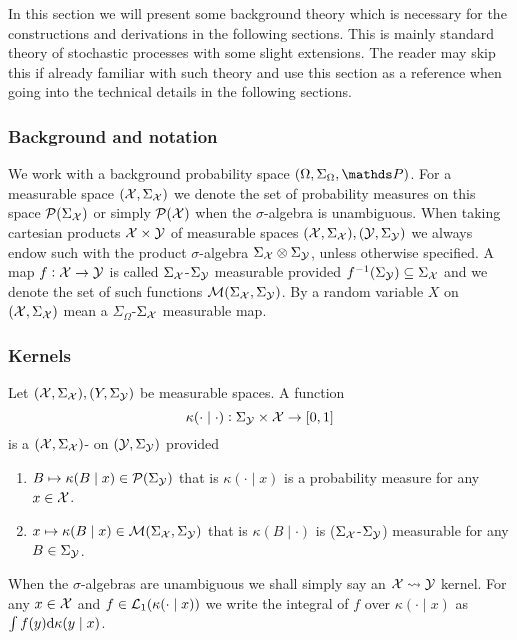 
In this section we will present some background theory which is
necessary for the constructions and derivations in the following
sections.
This is mainly standard theory of stochastic processes with some
slight extensions.
The reader may skip this if already familiar with such theory
and use this section as a reference when going into the technical
details in the following sections.

\subsubsection{Background and notation}

We work with a background probability space $(\Omega, \Sigma_\Omega, \Prob)$.
For a measurable space $(\mathcal{X}, \Sigma_{\mathcal{X}})$ we denote
the set of probability measures on this space $\mathcal{P}(\Sigma_\mathcal{X})$ or
simply $\mathcal{P}(\mathcal{X})$ when the $\sigma$-algebra is unambiguous.
When taking cartesian products $\mathcal{X} \times \mathcal{Y}$ of measurable spaces
$(\mathcal{X}, \Sigma_\mathcal{X}), (\mathcal{Y}, \Sigma_\mathcal{Y})$ we always endow such
with the product $\sigma$-algebra $\Sigma_\mathcal{X} \otimes \Sigma_\mathcal{Y}$,
unless otherwise specified.
A map $f: \mathcal{X} \to \mathcal{Y}$ is called $\Sigma_{\mathcal{X}}$-$\Sigma_{\mathcal{Y}}$
measurable provided $f^{-1}(\Sigma_{\mathcal{Y}}) \subseteq \Sigma_{\mathcal{X}}$
and we denote the set of such functions $\mathcal{M}(\Sigma_{\mathcal{X}},
\Sigma_{\mathcal{Y}})$.
By a random variable $X$ on $(\mathcal{X}, \Sigma_{\mathcal{X}})$ mean a
$\Sigma_\Omega$-$\Sigma_{\mathcal{X}}$ measurable map.

\subsubsection{Kernels}

\begin{defn}
  Let $(\mathcal{X}, \Sigma_\mathcal{X}), (Y, \Sigma_\mathcal{Y})$ be measurable spaces.
  A function
  \[ \kappa(\cdot \mid \cdot) : \Sigma_\mathcal{Y} \times \mathcal{X} \to [0,1] \]
  is a $(\mathcal{X}, \Sigma_\mathcal{X})$-
  on $(\mathcal{Y}, \Sigma_\mathcal{Y})$ provided
  \begin{enumerate}
    \item $B \mapsto \kappa(B \mid x) \in \mathcal{P}(\Sigma_\mathcal{Y})$
      that is $\kappa(\cdot \mid x)$ is a probability measure
      for any $x \in \mathcal{X}$.
    \item
      $x \mapsto \kappa(B \mid x) \in \mathcal{M}(\Sigma_\mathcal{X}, \Sigma_\mathcal{Y})$
      that is $\kappa(B \mid \cdot)$ is ($\Sigma_\mathcal{X}$-$\Sigma_\mathcal{Y}$)
      measurable for any $B \in \Sigma_\mathcal{Y}$.
  \end{enumerate}
  When the $\sigma$-algebras are unambiguous we shall simply say an
  $\mathcal{X} \leadsto \mathcal{Y}$ kernel.
  For any $x \in \mathcal{X}$ and $f \in \mathcal{L}_1(\kappa(\cdot \mid x))$
  we write the integral of $f$ over $\kappa(\cdot \mid x)$ as
  $\int f(y) \mathrm{d} \kappa(y \mid x)$.
  \label{defn:probKer}
\end{defn}

